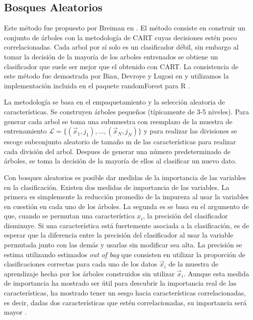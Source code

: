 \documentclass[letterpaper,12pt]{book}
\begin{document}
\subsection{Bosques Aleatorios}

Este método fue propuesto por Breiman en \cite{breiman_random_2001}. El método consiste en construir un conjunto de árboles con la metodología de CART cuyas decisiones estén poco correlacionadas. Cada arbol por sí solo es un clasificador débil, sin embargo al tomar la decisión de la mayoría de los arboles entrenados se obtiene un clasificador que suele ser mejor que el obtenido con CART. La consistencia de este método fue demostrada por Biau, Devroye y Lugosi en \cite{biau_consistency_2008} y utilizamos la implementación incluida en el paquete randomForest \cite{randomForest} para R \cite{rbase}.

La metodología se basa en el empaquetamiento y la selección aleatoria de características. Se construyen árboles pequeños (típicamente de 3-5 niveles). Para generar cada arbol se toma una submuestra con reemplazo de la muestra de entrenamiento $\mathcal{L}=\{(\vec{x}_1,j_1),\dots,(\vec{x}_N,j_N)\}$ y para realizar las divisiones se escoge subconjunto aleatorio de tamaño m de las características  para realizar cada división del arbol. Despues de generar una número predeterminado de árboles, se toma la decisión de la mayoría de ellos al clasificar un nuevo dato.

Con bosques aleatorios es posible dar medidas de la importancia de las variables en la clasificación. Existen dos medidas de importancia de las variables. La primera es simplemente la reducción promedio de la impureza al usar la variables en cuestión en cada uno de los árboles. La segunda es se basa en el argumento de que, cuando se permutan una característica $x_i$, la precisión del clasificador disminuye. Si una característica está fuertemente asociada a la clasificación, es de esperar que la diferencia entre la precisión del clasificador al usar la variable permutada junto con las demás y usarlas sin modificar sea alta. La precisión se estima utilizando estimados \textit{out of bag} que consisten en utilizar la proporción de clasificaciones correctas para cada uno de los datos $\vec{x}_i$ de la muestra de aprendizaje hecha por los árboles construidos sin utilizar $\vec{x}_i$. Aunque esta medida de importancia ha mostrado ser útil para descubrir la importancia real de las características, ha mostrado tener un sesgo hacia características correlacionadas, es decir, dadas dos características que estén correlacionadas, su importancia será mayor \cite{strobl_conditional_2008}.
\end{document}
